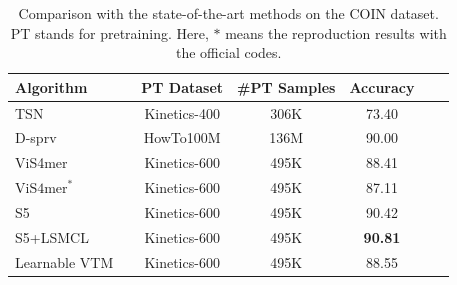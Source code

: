 \documentclass{article}
\begin{document}
\begin{table}[t]
    \caption
    {
       Comparison with the state-of-the-art methods on the COIN dataset. PT stands for pretraining. Here, $\ast$ means the reproduction results with the official codes.
    }
    \centering
    \footnotesize
    \begin{tabular}{@{} l c c c c c c @{} }
        \toprule
        Algorithm && PT Dataset & \#PT Samples & Accuracy \\
        \midrule
          TSN~\citep{tang2020comprehensive} && Kinetics-400 & 306K & 73.40  \\
          D-sprv~\citep{lin2022learning} && HowTo100M & 136M & 90.00  \\
          ViS4mer~\citep{islam2022vis4mer} && Kinetics-600 & 495K & 88.41 \\
          $\textrm{ViS4mer}^\ast$~\citep{islam2022vis4mer} && Kinetics-600 & 495K & 87.11 \\
          S5~\citep{wang2023s5} && Kinetics-600 & 495K & 90.42 \\
          S5+LSMCL~\citep{wang2023s5} && Kinetics-600 & 495K & \textbf{90.81} \\
          Learnable VTM && Kinetics-600 & 495K & 88.55 \\
        \bottomrule
    \end{tabular}
   \label{table:coin}
\end{table}
\end{document}
